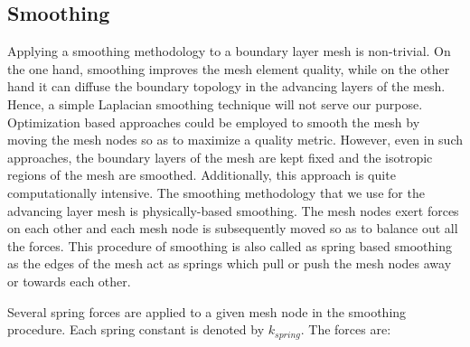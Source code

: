 \documentclass[conf]{new-aiaa}
\begin{document}
\subsection{Smoothing}

Applying a smoothing methodology to a boundary layer mesh is non-trivial. On the one hand, smoothing improves the mesh element quality, while on the other hand it can diffuse the boundary topology in the advancing layers of the mesh. Hence, a simple Laplacian smoothing technique will not serve our purpose. Optimization based approaches could be employed to smooth the mesh by moving the mesh nodes so as to maximize a quality metric\cite{canann1998approach}. However, even in such approaches, the boundary layers of the mesh are kept fixed and the isotropic regions of the mesh are smoothed. Additionally, this approach is quite computationally intensive. The smoothing methodology that we use for the advancing layer mesh is physically-based smoothing. The mesh nodes exert forces on each other and each mesh node is subsequently moved so as to balance out all the forces. This procedure of smoothing is also called as spring based smoothing as the edges of the mesh act as springs which pull or push the mesh nodes away or towards each other.

Several spring forces are applied to a given mesh node in the smoothing procedure. Each spring constant is denoted by $\mathit{k_{spring}}$. The forces are:
\end{document}
